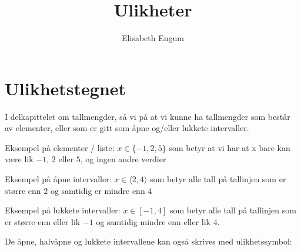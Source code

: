 \documentclass[
  letterpaper,
  DIV=11,
  numbers=noendperiod]{scrartcl}
\title{Ulikheter}
\author{Elisabeth Engum}
\date{}
\theoremstyle{definition}
\theoremstyle{definition}
\theoremstyle{remark}
\begin{document}
\maketitle
\ifdefined\Shaded\renewenvironment{Shaded}{\begin{tcolorbox}[borderline west={3pt}{0pt}{shadecolor}, frame hidden, enhanced, sharp corners, boxrule=0pt, breakable, interior hidden]}{\end{tcolorbox}}\fi

\hypertarget{sec-utegnet}{%
\section{Ulikhetstegnet}\label{sec-utegnet}}

I delkapittelet om tallmengder, så vi på at vi kunne ha tallmengder som
består av elementer, eller som er gitt som åpne og/eller lukkete
intervaller.

\begin{tcolorbox}[enhanced jigsaw, colframe=quarto-callout-caution-color-frame, left=2mm, arc=.35mm, breakable, rightrule=.15mm, toprule=.15mm, leftrule=.75mm, opacityback=0, colback=white, bottomrule=.15mm]

Eksempel på elementer / liste: \(x\in\{-1, 2, 5\}\) som betyr at vi har
at x bare kan være lik \(-1\), \(2\) eller \(5\), og ingen andre verdier

Eksempel på åpne intervaller: \(x\in\langle 2, 4\rangle\) som betyr alle
tall på tallinjen som er større enn \(2\) og samtidig er mindre enn
\(4\)

Eksempel på lukkete intervaller: \(x\in\left[-1, 4\right]\) som betyr
alle tall på tallinjen som er større enn eller lik \(-1\) og samtidig
mindre enn eller lik \(4\).

\end{tcolorbox}

De åpne, halvåpne og lukkete intervallene kan også skrives med
ulikhetssymbol:
\end{document}
